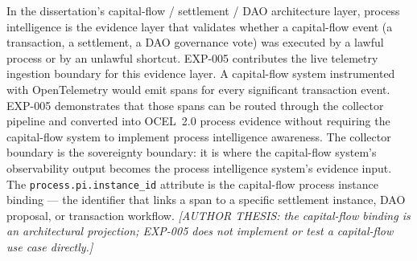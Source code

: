 In the dissertation's capital-flow / settlement / DAO architecture layer, process intelligence
is the evidence layer that validates whether a capital-flow event (a transaction, a settlement,
a DAO governance vote) was executed by a lawful process or by an unlawful shortcut. EXP-005
contributes the live telemetry ingestion boundary for this evidence layer. A capital-flow
system instrumented with OpenTelemetry would emit spans for every significant transaction
event. EXP-005 demonstrates that those spans can be routed through the collector pipeline
and converted into OCEL~2.0 process evidence without requiring the capital-flow system to
implement process intelligence awareness. The collector boundary is the sovereignty boundary:
it is where the capital-flow system's observability output becomes the process intelligence
system's evidence input. The \texttt{process.pi.instance\_id} attribute is the capital-flow
process instance binding --- the identifier that links a span to a specific settlement
instance, DAO proposal, or transaction workflow. \textit{[AUTHOR THESIS: the capital-flow
binding is an architectural projection; EXP-005 does not implement or test a capital-flow
use case directly.]}
